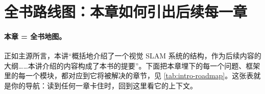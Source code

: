 \section{全书路线图：本章如何引出后续每一章}
\label{sec:intro-roadmap}

\paragraph{本章 = 全书地图。}
正如主源所言，本讲“概括地介绍了一个视觉 SLAM 系统的结构，作为后续内容的大纲……本讲介绍的内容构成了本书的提要”\cite{gaoxiang2019slam14}。下面把本章埋下的每一个问题、框架里的每一个模块，都对应到它将被解决的章节，见 \cref{tab:intro-roadmap}。这张表就是你的导航：读到任何一章卡住时，回到这里看它的上下文。

